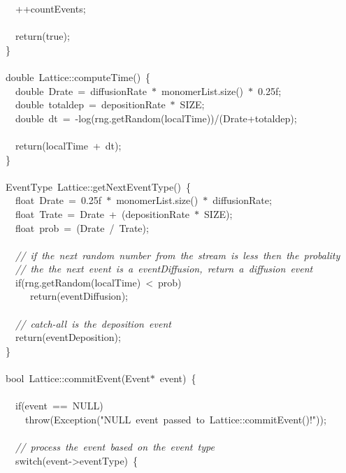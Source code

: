 {\ \ ++countEvents;\\
\ \\
\ \ return(true);\\
\}\\
\ \\
double\ Lattice::computeTime()\ \{\\
\ \ double\ Drate\ =\ diffusionRate\ $\ast$\ monomerList.size()\ $\ast$\ 0.25f;\\
\ \ double\ totaldep\ =\ depositionRate\ $\ast$\ SIZE;\\
\ \ double\ dt\ =\ -{}log(rng.getRandom(localTime))/(Drate+totaldep);\\
\ \\
\ \ return(localTime\ +\ dt);\\
\}\\
\ \\
EventType\ Lattice::getNextEventType()\ \{\\
\ \ float\ Drate\ =\ 0.25f\ $\ast$\ monomerList.size()\ $\ast$\ diffusionRate;\\
\ \ float\ Trate\ =\ Drate\ +\ (depositionRate\ $\ast$\ SIZE);\\
\ \ float\ prob\ =\ (Drate\ /\ Trate);\\
\ \\
\ \ \textsl{//\ if\ the\ next\ random\ number\ from\ the\ stream\ is\ less\ then\ the\ probality}\\
\ \ \textsl{//\ the\ the\ next\ event\ is\ a\ eventDiffusion,\ return\ a\ diffusion\ event}\\
\ \ if(rng.getRandom(localTime)\ <{}\ prob)\\
\ \ \ \ \ return(eventDiffusion);\\
\ \\
\ \ \textsl{//\ catch-{}all\ is\ the\ deposition\ event}\\
\ \ return(eventDeposition);\\
\}\\
\ \\
bool\ Lattice::commitEvent(Event$\ast$\ event)\ \{\\
\ \\
\ \ if(event\ ==\ NULL)\\
\ \ \ \ throw(Exception("{}NULL\ event\ passed\ to\ Lattice::commitEvent()!"{}));\\
\ \\
\ \ \textsl{//\ process\ the\ event\ based\ on\ the\ event\ type}\\
\ \ switch(event-{}>{}eventType)\ \{\\
}
